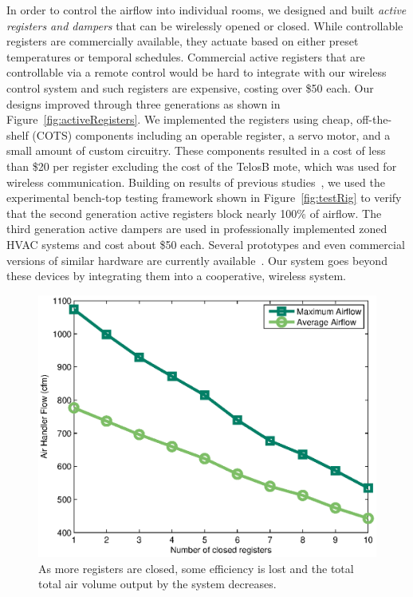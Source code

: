 In order to control the airflow into individual rooms, we designed and built
{\em active registers and dampers} that can be wirelessly opened or
closed. While controllable registers are commercially available, they actuate
based on either preset temperatures or temporal schedules. Commercial active
registers that are controllable via a remote control would be hard to integrate
with our wireless control system and such registers are expensive, costing over
\$50 each. Our designs improved through three generations as shown in
Figure~\ref{fig:activeRegisters}. We implemented the registers using cheap,
off-the-shelf (COTS) components including an operable register, a servo motor,
and a small amount of custom circuitry. These components resulted in a cost of
less than \$20 per register excluding the cost of the TelosB mote, which was
used for wireless communication. Building on results of previous
studies~\cite{TRANE2003, walker2008residential, watts2007application}, we used
the experimental bench-top testing framework shown in Figure~\ref{fig:testRig}
to verify that the second generation active registers block nearly 100\% of
airflow. The third generation active dampers are used in professionally
implemented zoned HVAC systems and cost about \$50 each. Several prototypes and
even commercial versions of similar hardware are currently
available~\cite{walker2003register,walker2008residential,watts2007application}.
Our system goes beyond these devices by integrating them into a cooperative,
wireless system.

\begin{figure}[ht]
  \centering
  \includegraphics[width=0.6\columnwidth]{fig/regClosingAirflow.eps}
  \caption[Effect of Closing Registers on Air Flow]{As more registers are
    closed, some efficiency is lost and the total total air volume output by the
    system decreases.}
  \label{fig:regClosingAirflow}
\end{figure}


